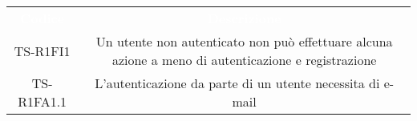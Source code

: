 {
\renewcommand{\arraystretch}{1.5}
\centering
\begin{longtable}{ c c }
\rowcolor{rossoep}
\textcolor{white}{\textbf{Codice}} & \textcolor{white}{\textbf{Descrizione}} \\
TS-R1FI1 & Un utente non autenticato non può effettuare alcuna azione a meno di autenticazione e registrazione \\

TS-R1FA1.1 & L'autenticazione da parte di un utente necessita di e-mail \\
\end{longtable}
}
